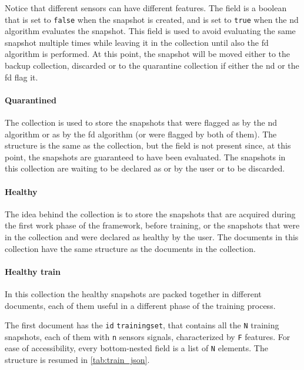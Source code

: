 Notice that different sensors can have different features. The  field is a boolean that is set to \texttt{false} when the snapshot is created, and is set to \texttt{true} when the \gls{nd} algorithm evaluates the snapshot. This field is used to avoid evaluating the same snapshot multiple times while leaving it in the collection until also the \gls{fd} algorithm is performed. At this point, the snapshot will be moved either to the backup collection, discarded or to the quarantine collection if either the \gls{nd} or the \gls{fd} flag it.

\paragraph{Quarantined}
The  collection is used to store the snapshots that were flagged as  by the \gls{nd} algorithm or as  by the \gls{fd} algorithm (or were flagged by both of them). The structure is the same as the  collection, but the  field is not present since, at this point, the snapshots are guaranteed to have been evaluated. The snapshots in this collection are waiting to be declared as  or  by the user or to be discarded.

\paragraph{Healthy}
The idea behind the  collection is to store the snapshots that are acquired during the first work phase of the framework, before training, or the snapshots that were in the  collection and were declared as healthy by the user. The documents in this collection have the same structure as the documents in the  collection.

\paragraph{Healthy train}
In this collection the healthy snapshots are packed together in different documents, each of them useful in a different phase of the training process.

{The first document has the \texttt{id} \texttt{training\textunderscore set}, that contains all the \texttt{N} training snapshots, each of them with \texttt{n} sensors signals, characterized by \texttt{F} features. For ease of accessibility, every bottom-nested field is a list of \texttt{N} elements. The structure is resumed in \autoref{tab:train_json}.}


